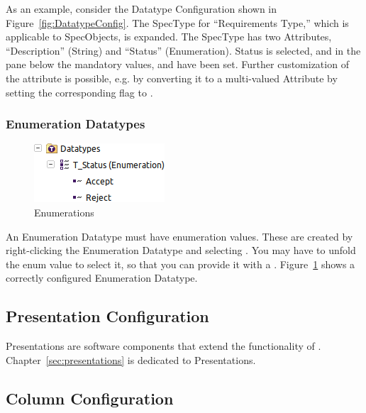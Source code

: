 As an example, consider the Datatype Configuration shown in Figure~\ref{fig:DatatypeConfig}.
The SpecType for ``Requirements Type,'' which is applicable to
SpecObjects, is expanded.  The SpecType has two Attributes,
``Description'' (String) and ``Status'' (Enumeration).  Status is
selected, and in the pane below the mandatory values,  and
 have been set.  Further customization of the attribute is
possible, e.g.  by converting it to a multi-valued Attribute by setting
the corresponding flag to .

\subsubsection{Enumeration Datatypes}

\begin{figure}
\centering      
\includegraphics[width=0.3\linewidth]{../rmf-images/rmf_enumeration.png}
\caption{Enumerations}      
\label{fig:Enumerations}
\end{figure}

An Enumeration Datatype must have enumeration values.  These are created
by right-clicking the Enumeration Datatype and selecting .  You may have to unfold the enum value to select it, so that you can provide it with a .  Figure~\ref{fig:Enumerations} shows a correctly configured Enumeration Datatype.

\subsection{Presentation Configuration}
\label{sec:presentation_configuration}

Presentations are software components that extend the functionality of \pror{}.  Chapter~\ref{sec:presentations} is dedicated to Presentations.

\subsection{Column Configuration}
\label{sec:column_configuration}

